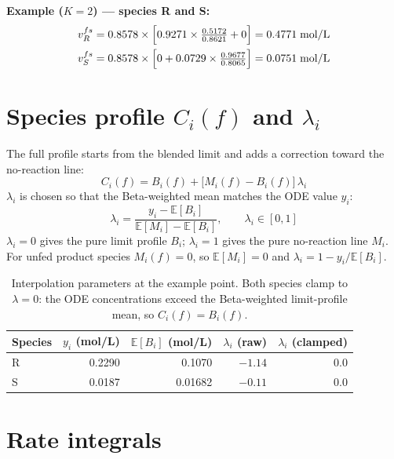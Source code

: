 \documentclass[11pt]{article}
\newcommand{\Eb}{\mathbb{E}}
\begin{document}
\textbf{Example ($K=2$) --- species R and S:}
\begin{align}
  v^{fs}_R &= 0.8578\times\Bigl[0.9271\times\tfrac{0.5172}{0.8621} + 0\Bigr]
             = 0.4771\;\text{mol/L} \label{eq:vfsR}\\
  v^{fs}_S &= 0.8578\times\Bigl[0 + 0.0729\times\tfrac{0.9677}{0.8065}\Bigr]
             = 0.0751\;\text{mol/L} \label{eq:vfsS}
\end{align}

\section{Species profile $C_i(f)$ and $\lambda_i$}

The full profile starts from the blended limit and adds a correction toward the
no-reaction line:
\begin{equation}
  C_i(f) = B_i(f) + \bigl[M_i(f) - B_i(f)\bigr]\,\lambda_i
  \label{eq:Cprofile}
\end{equation}
$\lambda_i$ is chosen so that the Beta-weighted mean matches the ODE value $y_i$:
\begin{equation}
  \lambda_i = \frac{y_i - \Eb[B_i]}{\Eb[M_i] - \Eb[B_i]},
  \qquad \lambda_i \in [0,1]
  \label{eq:lambda}
\end{equation}
$\lambda_i = 0$ gives the pure limit profile $B_i$; $\lambda_i = 1$ gives the pure
no-reaction line $M_i$.  For unfed product species $M_i(f) = 0$, so $\Eb[M_i] = 0$ and
$\lambda_i = 1 - y_i/\Eb[B_i]$.

\begin{table}[h]
\centering
\small
\begin{tabular}{lrrrr}
\toprule
Species & $y_i$ (mol/L) & $\Eb[B_i]$ (mol/L) & $\lambda_i$ (raw) & $\lambda_i$ (clamped) \\
\midrule
R & 0.2290 & 0.1070 & $-1.14$ & 0.0 \\
S & 0.0187 & 0.01682 & $-0.11$ & 0.0 \\
\bottomrule
\end{tabular}
\caption{Interpolation parameters at the example point.  Both species clamp to
$\lambda=0$: the ODE concentrations exceed the Beta-weighted limit-profile mean, so
$C_i(f) = B_i(f)$.}
\end{table}

\section{Rate integrals}
\end{document}
